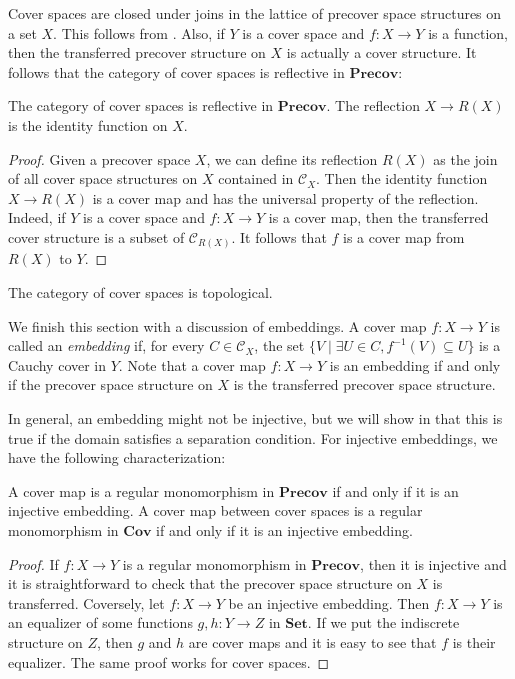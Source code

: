 \documentclass[reqno]{amsart}
\theoremstyle{definition}
\theoremstyle{remark}
\numberwithin{figure}{section}
\newcommand{\cat}[1]{\mathbf{#1}}
\begin{document}
Cover spaces are closed under joins in the lattice of precover space structures on a set $X$.
This follows from .
Also, if $Y$ is a cover space and $f : X \to Y$ is a function, then the transferred precover structure on $X$ is actually a cover structure.
It follows that the category of cover spaces is reflective in $\cat{Precov}$:

\begin{prop}
The category of cover spaces is reflective in $\cat{Precov}$.
The reflection $X \to R(X)$ is the identity function on $X$.
\end{prop}
\begin{proof}
Given a precover space $X$, we can define its reflection $R(X)$ as the join of all cover space structures on $X$ contained in $\mathcal{C}_X$.
Then the identity function $X \to R(X)$ is a cover map and has the universal property of the reflection.
Indeed, if $Y$ is a cover space and $f : X \to Y$ is a cover map, then the transferred cover structure is a subset of $\mathcal{C}_{R(X)}$.
It follows that $f$ is a cover map from $R(X)$ to $Y$.
\end{proof}

\begin{cor}
The category of cover spaces is topological.
\end{cor}

We finish this section with a discussion of embeddings.
A cover map $f : X \to Y$ is called an \emph{embedding} if, for every $C \in \mathcal{C}_X$,
the set $\{ V \mid \exists U \in C, f^{-1}(V) \subseteq U \}$ is a Cauchy cover in $Y$.
Note that a cover map $f : X \to Y$ is an embedding if and only if the precover space structure on $X$ is the transferred precover space structure.

In general, an embedding might not be injective, but we will show in  that this is true if the domain satisfies a separation condition.
For injective embeddings, we have the following characterization:

\begin{prop}
A cover map is a regular monomorphism in $\cat{Precov}$ if and only if it is an injective embedding.
A cover map between cover spaces is a regular monomorphism in $\cat{Cov}$ if and only if it is an injective embedding.
\end{prop}
\begin{proof}
If $f : X \to Y$ is a regular monomorphism in $\cat{Precov}$, then it is injective and it is straightforward to check that the precover space structure on $X$ is transferred.
Coversely, let $f : X \to Y$ be an injective embedding.
Then $f : X \to Y$ is an equalizer of some functions $g,h : Y \to Z$ in $\cat{Set}$.
If we put the indiscrete structure on $Z$, then $g$ and $h$ are cover maps and it is easy to see that $f$ is their equalizer.
The same proof works for cover spaces.
\end{proof}
\end{document}
